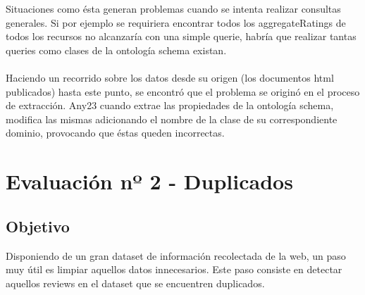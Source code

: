 Situaciones como ésta generan problemas cuando se intenta realizar consultas generales. Si por ejemplo se requiriera encontrar todos los aggregateRatings de todos los recursos no alcanzaría con 
una simple querie, habría que realizar tantas queries como clases de la ontología schema existan.
\\\\
Haciendo un recorrido sobre los datos desde su origen (los documentos html publicados) hasta este punto, se encontró que el problema se 
originó en el proceso de extracción. 
Any23 cuando extrae las propiedades de la ontología schema, modifica las mismas adicionando el nombre de la clase de su correspondiente dominio, provocando que éstas queden incorrectas.

\section{Evaluación nº 2 - Duplicados}
\label{section:evaluacion-duplicados}

\subsection*{Objetivo}
Disponiendo de un gran dataset de información recolectada de la web, un paso muy útil es limpiar aquellos datos innecesarios. 
Este paso consiste en detectar aquellos reviews en el dataset que se encuentren duplicados.

